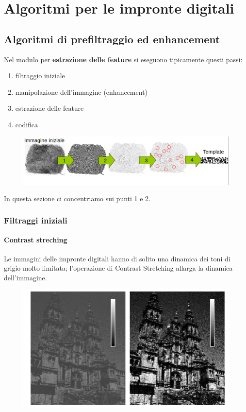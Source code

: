 \chapter{Algoritmi per le impronte digitali}

\section{Algoritmi di prefiltraggio ed enhancement}

Nel modulo per \textbf{estrazione delle feature} si eseguono
tipicamente questi passi:
\begin{enumerate}
    \item filtraggio iniziale
    \item manipolazione dell'immagine (enhancement)
    \item estrazione delle feature
    \item codifica
\end{enumerate}

\begin{figure}[ht]
    \centering
    \includegraphics[width=1\linewidth]{chapters/images-chap6/estrazione-fet.png}
\end{figure}

In questa sezione ci concentriamo sui punti 1 e 2.

\subsection{Filtraggi iniziali}

\subsubsection{Contrast streching}
Le immagini delle impronte digitali hanno di
solito una dinamica dei toni di grigio molto
limitata; l’operazione di Contrast Stretching allarga la
dinamica dell’immagine.

\begin{figure}[ht]
    \centering
    \includegraphics[width=0.5\linewidth]{chapters/images-chap6/constrast-stre.png}
\end{figure}

